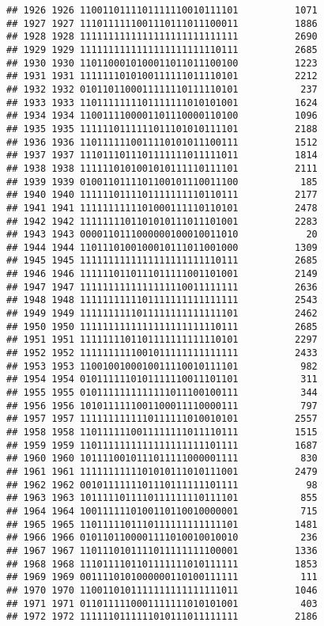\documentclass[]{article}
\begin{document}
\begin{verbatim}
## 1926 1926 1100110111101111110010111101          1071
## 1927 1927 1110111111001110111011100011          1886
## 1928 1928 1111111111111111111111111111          2690
## 1929 1929 1111111111111111111111110111          2685
## 1930 1930 1101100010100011011011100100          1223
## 1931 1931 1111111010100111111011110101          2212
## 1932 1932 0101101100011111110111110101           237
## 1933 1933 1101111111101111111010101001          1624
## 1934 1934 1100111100001101110000110100          1096
## 1935 1935 1111110111111011101010111101          2188
## 1936 1936 1101111110011110101011100111          1512
## 1937 1937 1110111011101111111011111011          1814
## 1938 1938 1111110101001010111110111101          2111
## 1939 1939 0100110111101100101110011100           185
## 1940 1940 1111110111101111111110110111          2177
## 1941 1941 1111111111101000111110110101          2478
## 1942 1942 1111111101101010111011101001          2283
## 1943 1943 0000110111000000100010011010            20
## 1944 1944 1101110100100010111011001000          1309
## 1945 1945 1111111111111111111111110111          2685
## 1946 1946 1111110110111011111001101001          2149
## 1947 1947 1111111111111111110011111111          2636
## 1948 1948 1111111111101111111111111111          2543
## 1949 1949 1111111111011111111111111101          2462
## 1950 1950 1111111111111111111111110111          2685
## 1951 1951 1111111101101111111111110101          2297
## 1952 1952 1111111111001011111111111111          2433
## 1953 1953 1100100100010011110010111101           982
## 1954 1954 0101111110101111110011101101           311
## 1955 1955 0101111111111111011100100111           344
## 1956 1956 1010111111001100011110000111           797
## 1957 1957 1111111111110111111010010101          2557
## 1958 1958 1101111110011111111011110111          1515
## 1959 1959 1101111111111111111111101111          1687
## 1960 1960 1011110010111011111000001111           830
## 1961 1961 1111111111101010111010111001          2479
## 1962 1962 0010111111101110111111101111            98
## 1963 1963 1011111011110111111110111101           855
## 1964 1964 1001111110100110110010000001           715
## 1965 1965 1101111101110111111111111101          1481
## 1966 1966 0101101100001111010010010010           236
## 1967 1967 1101110101111011111111100001          1336
## 1968 1968 1110111101101111111010111111          1853
## 1969 1969 0011110101000000110100111111           111
## 1970 1970 1100110101111111111111111011          1046
## 1971 1971 0110111110001111111010101001           403
## 1972 1972 1111110111111010111011111111          2186

\end{verbatim}
\end{document}
